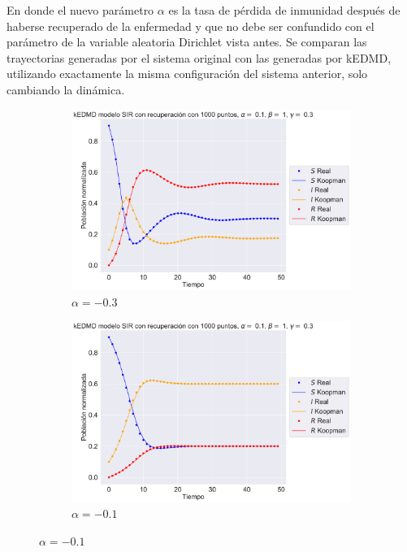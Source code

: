 En donde el nuevo parámetro $\alpha$ es la tasa de pérdida de inmunidad después de haberse recuperado de la enfermedad y que no debe ser confundido con el parámetro de la variable aleatoria Dirichlet vista antes.
Se comparan las trayectorias generadas por el sistema original con las generadas por kEDMD, utilizando exactamente la misma configuración del sistema anterior, solo cambiando la dinámica.
\begin{figure}[htbp]
    \centering
    \begin{subfigure}[b]{0.32\textwidth}
        \centering
        \includegraphics[width=\textwidth]{img/content/chapter3/SIR_rec1.pdf}
        \caption{$\alpha=-0.3$}
        \label{fig:image1}
    \end{subfigure}
    \hfill
    \begin{subfigure}[b]{0.32\textwidth}
        \centering
        \includegraphics[width=\textwidth]{img/content/chapter3/SIR_rec2.pdf}
        \caption{$\alpha=-0.1$}

\end{subfigure}
\end{figure}
